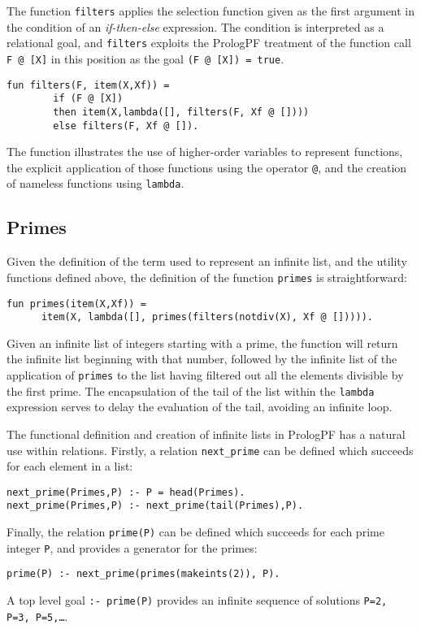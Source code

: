 The function \texttt{filters} applies the selection function given as the first 
argument in the condition of an \textit{if-then-else} expression.  The condition is
interpreted as a relational goal, and \texttt{filters} exploits the
PrologPF treatment of the function call \texttt{F @ [X]} in this position as the goal
\texttt{(F @ [X]) = true}.
\begin{verbatim}
fun filters(F, item(X,Xf)) =
        if (F @ [X])
        then item(X,lambda([], filters(F, Xf @ [])))
        else filters(F, Xf @ []).
\end{verbatim}
The function illustrates the use of higher-order variables to represent functions,
the explicit application of those functions using the operator \texttt{@}, and
the creation of nameless functions using \texttt{lambda}.

\subsection{Primes}

Given the definition of the term used to represent an infinite list, and the
utility functions defined above, the definition of the function \texttt{primes}
is straightforward:
\begin{verbatim}
fun primes(item(X,Xf)) =
      item(X, lambda([], primes(filters(notdiv(X), Xf @ [])))).
\end{verbatim}
Given an infinite list of integers starting with a prime, the function will return
the infinite list beginning with that number, followed by the infinite list of
the application of \texttt{primes} to the list having filtered out all the elements
divisible by the first prime.  The encapsulation of the tail of the list within
the \texttt{lambda} expression serves to delay the evaluation of the tail, avoiding
an infinite loop.

The functional definition and creation of infinite lists in PrologPF has a natural 
use within relations.  Firstly, a relation \texttt{next\_{}prime} can be defined
which succeeds for each element in a list:
\begin{verbatim}
next_prime(Primes,P) :- P = head(Primes).
next_prime(Primes,P) :- next_prime(tail(Primes),P).
\end{verbatim}
Finally, the relation \texttt{prime(P)} can be defined which succeeds for each prime
integer \texttt{P}, and provides a generator for the primes:
\begin{verbatim}
prime(P) :- next_prime(primes(makeints(2)), P).
\end{verbatim}
A top level goal \texttt{:- prime(P)} provides an infinite sequence of solutions
\texttt{P=2, P=3, P=5,\ldots}.

